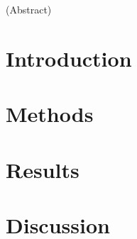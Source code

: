 
(Abstract)

\section{Introduction}


\section{Methods}


\section{Results}


\section{Discussion}

